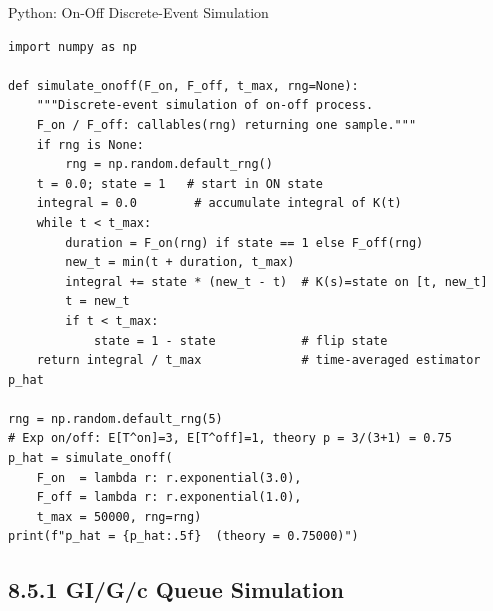 \documentclass[aspectratio=169,10pt]{beamer}
\begin{document}
\begin{frame}[fragile]{Python: On-Off Discrete-Event Simulation}
\begin{lstlisting}[style=python]
import numpy as np

def simulate_onoff(F_on, F_off, t_max, rng=None):
    """Discrete-event simulation of on-off process.
    F_on / F_off: callables(rng) returning one sample."""
    if rng is None:
        rng = np.random.default_rng()
    t = 0.0; state = 1   # start in ON state
    integral = 0.0        # accumulate integral of K(t)
    while t < t_max:
        duration = F_on(rng) if state == 1 else F_off(rng)
        new_t = min(t + duration, t_max)
        integral += state * (new_t - t)  # K(s)=state on [t, new_t]
        t = new_t
        if t < t_max:
            state = 1 - state            # flip state
    return integral / t_max              # time-averaged estimator p_hat

rng = np.random.default_rng(5)
# Exp on/off: E[T^on]=3, E[T^off]=1, theory p = 3/(3+1) = 0.75
p_hat = simulate_onoff(
    F_on  = lambda r: r.exponential(3.0),
    F_off = lambda r: r.exponential(1.0),
    t_max = 50000, rng=rng)
print(f"p_hat = {p_hat:.5f}  (theory = 0.75000)")
\end{lstlisting}
\end{frame}

\subsection{8.5.1 GI/G/c Queue Simulation}
\end{document}
